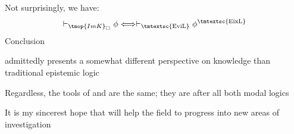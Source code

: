 Not surprisingly, we have:
\[ \vdash_{\tmop{ImK}_{\Box }} \phi \Longleftrightarrow
   \vdash_{\text{\tmtextsc{EviL}}} \phi^{\text{\tmtextsc{EixL}}} \]
Conclusion

 admittedly presents a somewhat different perspective on
knowledge than traditional epistemic logic

Regardless, the tools of  and  are the same; they
are after all both modal logics

It is my sincerest hope that  will help the field to progress
into new areas of investigation

% 

